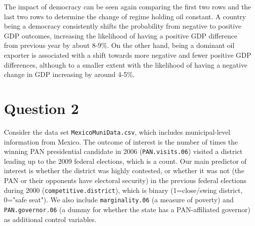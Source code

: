 \documentclass[12pt,letterpaper]{article}
\begin{document}
\begin{enumerate}
		The impact of democracy can be seen again comparing the first two rows and the last two rows to determine the change of regime holding oil constant. A country being a democracy consistently shifts the probability from negative to positive GDP outcomes, increasing the likelihood of having a positive GDP difference from previous year by about 8-9\%. 
		On the other hand, being a dominant oil exporter is associated with a shift towards more negative and fewer positive GDP differences, although to a smaller extent with the likelihood of having a negative change in GDP increasing by around 4-5\%. 
	
		
\end{enumerate}

\section*{Question 2} 
\vspace{.25cm}

\noindent Consider the data set \texttt{MexicoMuniData.csv}, which includes municipal-level information from Mexico. The outcome of interest is the number of times the winning PAN presidential candidate in 2006 (\texttt{PAN.visits.06}) visited a district leading up to the 2009 federal elections, which is a count. Our main predictor of interest is whether the district was highly contested, or whether it was not (the PAN or their opponents have electoral security) in the previous federal elections during 2000 (\texttt{competitive.district}), which is binary (1=close/swing district, 0="safe seat"). We also include \texttt{marginality.06} (a measure of poverty) and \texttt{PAN.governor.06} (a dummy for whether the state has a PAN-affiliated governor) as additional control variables. 
\end{document}
